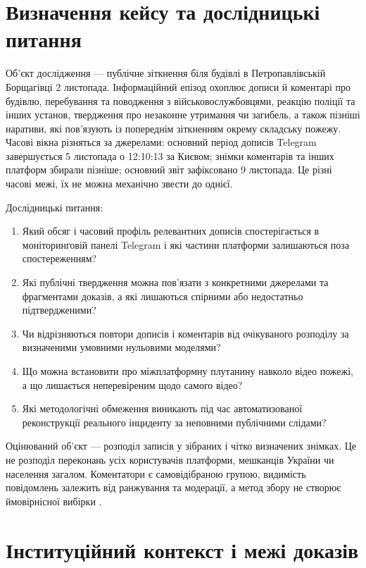 \section{Визначення кейсу та дослідницькі питання}

Об'єкт дослідження — публічне зіткнення біля будівлі в Петропавлівській Борщагівці 2 листопада. Інформаційний епізод охоплює дописи й коментарі про будівлю, перебування та поводження з військовослужбовцями, реакцію поліції та інших установ, твердження про незаконне утримання чи загибель, а також пізніші наративи, які пов'язують із попереднім зіткненням окрему складську пожежу. Часові вікна різняться за джерелами: основний період дописів Telegram завершується 5 листопада о 12:10:13 за Києвом; знімки коментарів та інших платформ збирали пізніше; основний звіт зафіксовано 9 листопада. Це різні часові межі, їх не можна механічно звести до однієї.

Дослідницькі питання:
\begin{enumerate}
\item Який обсяг і часовий профіль релевантних дописів спостерігається в моніторинговій панелі Telegram і які частини платформи залишаються поза спостереженням?
\item Які публічні твердження можна пов'язати з конкретними джерелами та фрагментами доказів, а які лишаються спірними або недостатньо підтвердженими?
\item Чи відрізняються повтори дописів і коментарів від очікуваного розподілу за визначеними умовними нульовими моделями?
\item Що можна встановити про міжплатформну плутанину навколо відео пожежі, а що лишається неперевіреним щодо самого відео?
\item Які методологічні обмеження виникають під час автоматизованої реконструкції реального інциденту за неповними публічними слідами?
\end{enumerate}

Оцінюваний об'єкт — розподіл записів у зібраних і чітко визначених знімках. Це не розподіл переконань усіх користувачів платформи, мешканців України чи населення загалом. Коментатори є самовідібраною групою, видимість повідомлень залежить від ранжування та модерації, а метод збору не створює ймовірнісної вибірки \citep{olteanu2019social,vicente2023sampling,pfeffer2023sample}.

\section{Інституційний контекст і межі доказів}

